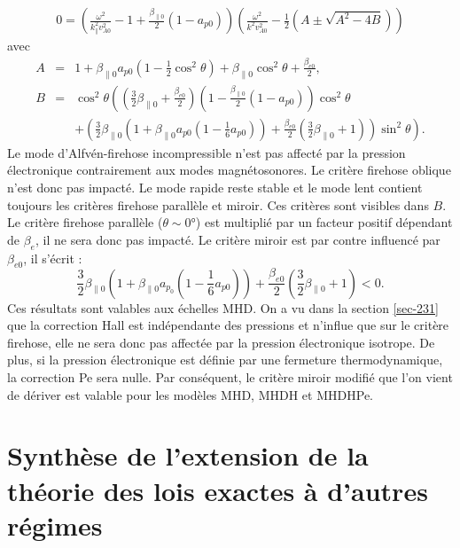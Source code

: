 \begin{eqnarray}
 \label{eq:lin_cpgpe_disp}   0 = \left(\frac{\omega^2}{k^2_{\parallel} v^2_{A0}} - 1 +   \frac{\beta_{\parallel 0}}{2} \left(1-a_{p0}\right) \right)\left(\frac{\omega^2}{k^2 v^2_{A0}} - \frac{1}{2}\left(A \pm \sqrt{A^2-4B}\right)\right)
\end{eqnarray}
avec 
\begin{eqnarray*}
    A &=& 1+ \beta_{\parallel 0}a_{p0} \left(1-\frac{1}{2}\cos^2 \theta\right)+\beta_{\parallel 0}\cos^2 \theta + \frac{\beta_{e0}}{2}, \\
    B &=&\cos^2 \theta \left( \left(\frac{3}{2}\beta_{\parallel 0} + \frac{\beta_{e0}}{2}\right)\left(1-\frac{\beta_{\parallel 0}}{2} \left(1-a_{p0}\right)\right)\cos^2 \theta \right. \\
    && \left. + \left(\frac{3}{2}\beta_{\parallel 0}\left(1+\beta_{\parallel 0}a_{p0}\left(1-\frac{1}{6}a_{p0}\right)\right)+  \frac{\beta_{e0}}{2} \left(\frac{3}{2}\beta_{\parallel 0} + 1\right)\right)\sin^2 \theta \right) .
\end{eqnarray*}
Le mode d'Alfvén-firehose incompressible n'est pas affecté par la pression électronique contrairement aux modes magnétosonores. Le critère firehose oblique n'est donc pas impacté. Le mode rapide reste stable et le mode lent contient toujours les critères firehose parallèle et miroir. Ces critères sont visibles dans $B$. Le critère firehose parallèle ($\theta \sim \ang{0}$) est multiplié par un facteur positif dépendant de  $\beta_e$, il ne sera donc pas impacté. Le critère miroir est par contre influencé par $\beta_{e0}$, il s'écrit : 
\begin{equation}
 \label{eq:crit_miroir_elec}   \frac{3}{2} \beta_{\parallel 0}\left(1 + \beta_{\parallel 0} a_{p_0}\left(1-\frac{1}{6}a_{p0}\right)\right) + \frac{\beta_{e 0}}{2}\left( \frac{3}{2} \beta_{\parallel 0} + 1\right) < 0 .
\end{equation}
Ces résultats sont valables aux échelles \ac{MHD}. On a vu dans la section \ref{sec-231} que la correction \acs{Hall} est indépendante des pressions et n'influe que sur le critère firehose, elle ne sera donc pas affectée par la pression électronique isotrope. De plus, si la pression électronique est définie par une fermeture thermodynamique, la correction \acl{Pe} sera nulle. Par conséquent, le critère miroir modifié que l'on vient de dériver est valable pour les modèles \ac{MHD}, \acs{MHDH} et \acs{MHDHPe}. 

\newpage
\section{Synthèse de l'extension de la théorie des lois exactes à d'autres régimes}
\label{synt-23}

